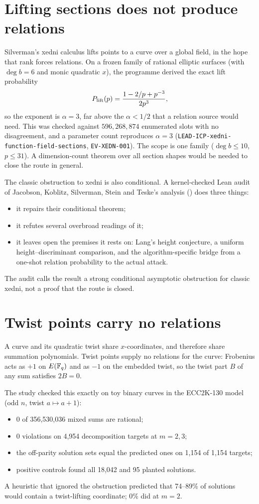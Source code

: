 \section{Lifting sections does not produce relations}

Silverman's xedni calculus lifts points to a curve over a global field, in
the hope that rank forces relations. On a frozen family of rational
elliptic surfaces (with $\deg b=6$ and monic quadratic $x$), the programme
derived the exact lift probability
\[
  P_{\rm lift}(p)=\frac{1-2/p+p^{-3}}{2p^3},
\]
so the exponent is $\alpha=3$, far above the $\alpha<1/2$ that a relation
source would need. This was checked against $596{,}268{,}874$ enumerated
slots with no disagreement, and a parameter count reproduces $\alpha=3$
(\texttt{LEAD-ICP-xedni-function-field-sections}, \texttt{EV-XEDN-001}).
The scope is one family ($\deg b\le10$, $p\le31$). A dimension-count theorem
over all section shapes would be needed to close the route in general.

The classic obstruction to xedni is also conditional. A kernel-checked Lean
audit of Jacobson, Koblitz, Silverman, Stein and Teske's analysis
() does three things:
\begin{itemize}
\item it repairs their conditional theorem;
\item it refutes several overbroad readings of it;
\item it leaves open the premises it rests on: Lang's height conjecture, a
  uniform height--discriminant comparison, and the algorithm-specific
  bridge from a one-shot relation probability to the actual attack.
\end{itemize}
The audit calls the result a strong conditional asymptotic obstruction for
classic xedni, not a proof that the route is closed.

\section{Twist points carry no relations}

A curve and its quadratic twist share $x$-coordinates, and therefore share
summation polynomials. Twist points supply no relations for the curve:
Frobenius acts as $+1$ on $E(\mathbb{F}_q)$ and as $-1$ on the
embedded twist, so the twist part $B$ of any sum satisfies $2B=0$.

The study  checked this
exactly on toy binary curves in the ECC2K-130 model (odd $n$, twist
$a\mapsto a+1$):
\begin{itemize}
\item 0 of 356{,}530{,}036 mixed sums are rational;
\item 0 violations on 4{,}954 decomposition targets at $m=2,3$;
\item the off-parity solution sets equal the predicted ones on 1{,}154 of
  1{,}154 targets;
\item positive controls found all 18{,}042 and 95 planted solutions.
\end{itemize}
A heuristic that ignored the obstruction predicted that 74--89\% of
solutions would contain a twist-lifting coordinate; 0\% did at $m=2$.

